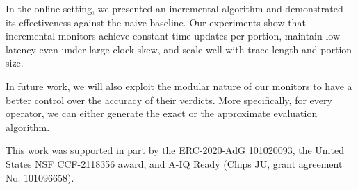 \documentclass[iicol,lineno]{sn-jnl}
\newcommand{\?}{\text{?}}
\begin{document}
	In the online setting, we presented an incremental algorithm and demonstrated its effectiveness against the naive baseline.
	Our experiments show that incremental monitors achieve constant-time updates per portion, maintain low latency even under large clock skew, and scale well with trace length and portion size.
	
	In future work, we will also exploit the modular nature of our monitors to have a better control over the accuracy of their verdicts. More specifically, for every operator, we can either generate the exact or the approximate evaluation algorithm.  
	
%	
	
	
	This work was supported in part by the ERC-2020-AdG 101020093, the United States NSF CCF-2118356 award, and A-IQ Ready (Chips JU, grant agreement No. 101096658).
	
\end{document}
